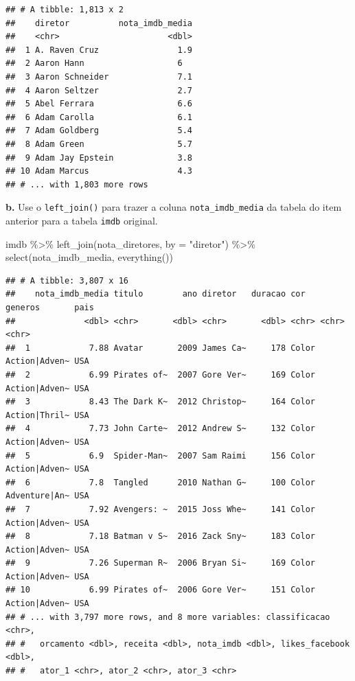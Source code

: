 \documentclass[
]{book}
\newenvironment{Shaded}{\begin{snugshade}}{\end{snugshade}}
\newcommand{\AttributeTok}[1]{\textcolor[rgb]{0.77,0.63,0.00}{#1}}
\newcommand{\FunctionTok}[1]{\textcolor[rgb]{0.00,0.00,0.00}{#1}}
\newcommand{\NormalTok}[1]{#1}
\newcommand{\SpecialCharTok}[1]{\textcolor[rgb]{0.00,0.00,0.00}{#1}}
\newcommand{\StringTok}[1]{\textcolor[rgb]{0.31,0.60,0.02}{#1}}
\begin{document}
\begin{verbatim}
## # A tibble: 1,813 x 2
##    diretor          nota_imdb_media
##    <chr>                      <dbl>
##  1 A. Raven Cruz                1.9
##  2 Aaron Hann                   6  
##  3 Aaron Schneider              7.1
##  4 Aaron Seltzer                2.7
##  5 Abel Ferrara                 6.6
##  6 Adam Carolla                 6.1
##  7 Adam Goldberg                5.4
##  8 Adam Green                   5.7
##  9 Adam Jay Epstein             3.8
## 10 Adam Marcus                  4.3
## # ... with 1,803 more rows
\end{verbatim}

\textbf{b.} Use o \texttt{left\_join()} para trazer a coluna
\texttt{nota\_imdb\_media} da tabela do item anterior
para a tabela \texttt{imdb} original.

\begin{Shaded}
\begin{Highlighting}[]
\NormalTok{imdb }\SpecialCharTok{\%\textgreater{}\%} 
  \FunctionTok{left\_join}\NormalTok{(nota\_diretores, }\AttributeTok{by =} \StringTok{"diretor"}\NormalTok{) }\SpecialCharTok{\%\textgreater{}\%} 
  \FunctionTok{select}\NormalTok{(nota\_imdb\_media, }\FunctionTok{everything}\NormalTok{())}
\end{Highlighting}
\end{Shaded}

\begin{verbatim}
## # A tibble: 3,807 x 16
##    nota_imdb_media titulo        ano diretor   duracao cor   generos       pais 
##              <dbl> <chr>       <dbl> <chr>       <dbl> <chr> <chr>         <chr>
##  1            7.88 Avatar       2009 James Ca~     178 Color Action|Adven~ USA  
##  2            6.99 Pirates of~  2007 Gore Ver~     169 Color Action|Adven~ USA  
##  3            8.43 The Dark K~  2012 Christop~     164 Color Action|Thril~ USA  
##  4            7.73 John Carte~  2012 Andrew S~     132 Color Action|Adven~ USA  
##  5            6.9  Spider-Man~  2007 Sam Raimi     156 Color Action|Adven~ USA  
##  6            7.8  Tangled      2010 Nathan G~     100 Color Adventure|An~ USA  
##  7            7.92 Avengers: ~  2015 Joss Whe~     141 Color Action|Adven~ USA  
##  8            7.18 Batman v S~  2016 Zack Sny~     183 Color Action|Adven~ USA  
##  9            7.26 Superman R~  2006 Bryan Si~     169 Color Action|Adven~ USA  
## 10            6.99 Pirates of~  2006 Gore Ver~     151 Color Action|Adven~ USA  
## # ... with 3,797 more rows, and 8 more variables: classificacao <chr>,
## #   orcamento <dbl>, receita <dbl>, nota_imdb <dbl>, likes_facebook <dbl>,
## #   ator_1 <chr>, ator_2 <chr>, ator_3 <chr>
\end{verbatim}
\end{document}
